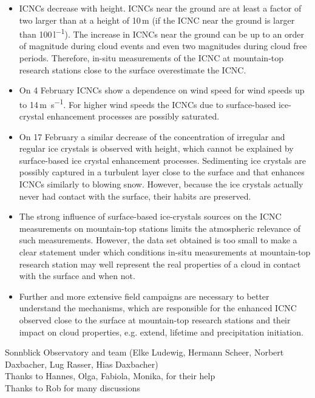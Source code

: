 \documentclass[draft,linenumbers]{agujournal}
\begin{document}
\begin{itemize}
\item ICNCs decrease with height. ICNCs near the ground are at least a factor of two larger than at a height of 10\,\si{m} (if the ICNC near the ground is larger than 100\,\si{l^{-1}}). The increase in ICNCs near the ground can be up to an order of magnitude during cloud events and even two magnitudes during cloud free periods. Therefore, in-situ measurements of the ICNC at mountain-top research stations close to the surface overestimate the ICNC.
\item On 4 February ICNCs show a dependence on wind speed for wind speeds up to 14\,\si{m s^{-1}}. For higher wind speeds the ICNCs due to surface-based ice-crystal enhancement processes are possibly saturated.
\item On 17 February a similar decrease of the concentration of irregular and regular ice crystals is observed with height, which cannot be explained by surface-based ice crystal enhancement processes. Sedimenting ice crystals are possibly captured in a turbulent layer close to the surface and that enhances ICNCs similarly to blowing snow. However, because the ice crystals actually never had contact with the surface, their habits are preserved.
\item The strong influence of surface-based ice-crystals sources on the ICNC measurements on mountain-top stations limits the atmospheric relevance of such measurements. However, the data set obtained is too small to make a clear statement under which conditions in-situ measurements at mountain-top research station may well represent the real properties of a cloud in contact with the surface and when not.
\item Further and more extensive field campaigns are necessary to better understand the mechanisms, which are responsible for the enhanced ICNC observed close to the surface at mountain-top research stations and their impact on cloud properties, e.g. extend, lifetime and precipitation initiation.
\end{itemize}
\label{Summary}



\begin{acronyms}
\end{acronyms}


\acknowledgments
Sonnblick Observatory and team (Elke Ludewig, Hermann Scheer, Norbert Daxbacher, Lug Rasser, Hias Daxbacher)\\
Thanks to Hannes, Olga, Fabiola, Monika, for their help\\
Thanks to Rob for many discussions
\end{document}
